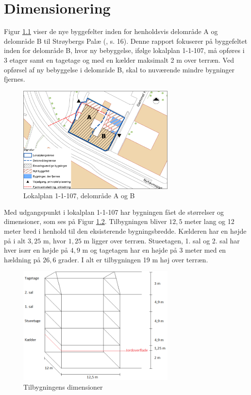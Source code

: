 \chapter{Dimensionering}

Figur \ref{fig:hej} viser de nye byggefelter inden for henholdsvis delområde A og delområde B til Strøybergs Palæ (\citep{lokalplan}, s. 16). Denne rapport fokuserer på byggefeltet inden for delområde B, hvor ny bebyggelse, ifølge lokalplan 1-1-107, må opføres i 3 etager samt en tagetage og med en kælder maksimalt 2 m over terræn. Ved opførsel af ny bebyggelse i delområde B, skal to nuværende mindre bygninger fjernes. 

\begin{figure}[htbp]
	\centering
	\includegraphics[width=0.7\textwidth]{billeder/signatur.png}
	\caption{Lokalplan 1-1-107, delområde A og B \citep{lokalplan[ bilag 2, s. 35]}}
	\label{fig:hej}
\end{figure}

Med udgangspunkt i lokalplan 1-1-107 har bygningen fået de størrelser og dimensioner, som ses på Figur \ref{fig:farvel}.
\newline \indent{     }  Tilbygningen bliver $12,\!5$ meter lang og 12 meter bred i henhold til den eksisterende bygningsbredde. Kælderen har en højde på i alt $3,\!25$ m, hvor $1,\!25$ m ligger over terræn. Stueetagen, 1. sal og 2. sal har hver især en højde på $4,\!9$ m og tagetagen har en højde på 3 meter med en hældning på $26,\!6$ grader. I alt er tilbygningen 19 m høj over terræn.

\begin{figure}[htbp]
	\centering
	\includegraphics[width=0.7\textwidth]{billeder/tilbygning2.png}
	\caption{Tilbygningens dimensioner}
	\label{fig:farvel}
\end{figure}

